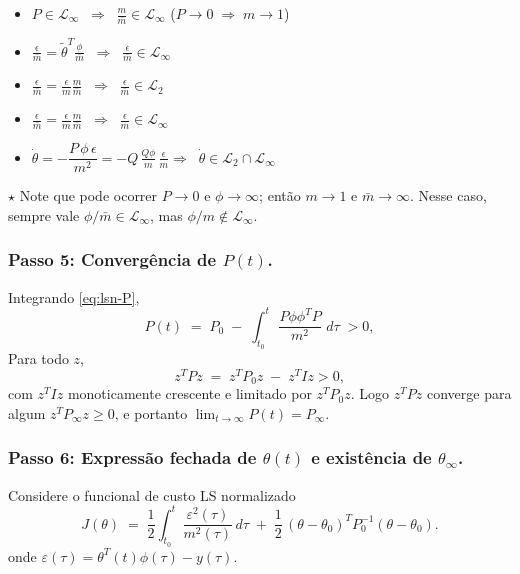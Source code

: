 \documentclass[10pt]{article}
\begin{document}
\begin{itemize}
    \item $P \in \mathcal{L}_{\infty} \;\;\Rightarrow\;\; \frac{m}{\bar{m}} \in \mathcal{L}_{\infty}$ ($P \to 0 \;\Rightarrow\; m \to 1$)
    
    \item $\frac{\epsilon}{\bar{m}} = \tilde{\theta}^T \frac{\phi}{\bar{m}} \;\;\Rightarrow\;\; \frac{\epsilon}{\bar{m}} \in \mathcal{L}_{\infty}$ 
    
    \item $\frac{\epsilon}{\bar{m}} = \frac{\epsilon}{m} \frac{m}{\bar{m}} \;\;\Rightarrow\;\; 
    \frac{\epsilon}{\bar m} \in \mathcal{L}_{2}$
    
    \item $\frac{\epsilon}{\bar{m}} = \frac{\epsilon}{m} \frac{m}{\bar{m}} \;\;\Rightarrow\;\;
    \frac{\epsilon}{m} \in \mathcal{L}_{\infty}$

    \item $\dot{\theta} = - \dfrac{P \, \phi \, \epsilon}{m^{2}}
    = -Q \, \frac{Q\phi}{m} \, \frac{\epsilon}{m} \Rightarrow \;\; \dot{\theta} \in \mathcal{L}_{2} \cap \mathcal{L}_{\infty}$
\end{itemize}

$\star$ \quad Note que pode ocorrer \(P\to0\) e \(\phi\to\infty\); então \(m\to1\) e \(\bar m\to\infty\).
Nesse caso, sempre vale \(\phi/\bar m\in \mathcal{L}_\infty\), mas \(\phi/m\notin \mathcal{L}_\infty\).

\subsubsection*{Passo 5: Convergência de \(P(t)\).}
Integrando \eqref{eq:lsn-P},
\[
P(t) \;=\; P_0 \;-\; \int_{t_0}^{t}
\,\frac{P\phi\phi^TP}{m^2}\,\,d\tau
\; >  0,
\]
Para todo \( z \),
\[
z^T P z \;=\; z^T P_0 z \;-\; z^T I z > 0,
\]
com \(z^T I z\) monoticamente crescente e limitado por \(z^T P_0 z\).
Logo \(z^T P z\) converge para algum \(z^T P_\infty z\ge0\), e portanto
\(\displaystyle \lim_{t\to\infty}P(t)=P_\infty\).

\subsubsection*{Passo 6: Expressão fechada de \(\theta(t)\) e existência de \(\theta_\infty\).}
Considere o funcional de custo LS normalizado
\[
J(\theta) \;=\; \frac12\int_{t_0}^{t}\!\frac{\varepsilon^2(\tau)}{m^2(\tau)}\,d\tau
\;+\; \frac12\,(\theta-\theta_0)^T P_0^{-1}(\theta-\theta_0).
\]
onde $\varepsilon(\tau) = \theta^T(t)\phi(\tau) - y(\tau)$.
\end{document}
